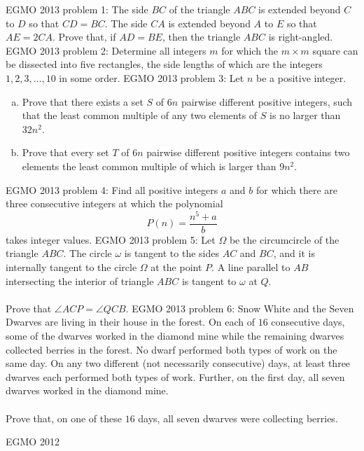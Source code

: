 EGMO 2013 problem 1:  The side $BC$ of the triangle $ABC$ is extended beyond $C$ to $D$ so that $CD = BC$.  The side $CA$ is extended beyond $A$ to $E$ so that $AE = 2CA$.  Prove that, if $AD=BE$, then the triangle $ABC$ is right-angled. 
EGMO 2013 problem 2:  Determine all integers $m$ for which the $m \times m$ square can be dissected into five rectangles, the side lengths of which are the integers $1,2,3,\ldots,10$ in some order. 
EGMO 2013 problem 3:  Let $n$ be a positive integer.
\begin{enumerate}[(a)]
  \item Prove that there exists a set $S$ of $6n$ pairwise different positive integers, such that the least common multiple of any two elements of $S$ is no larger than $32n^2$.
  \item Prove that every set $T$ of $6n$ pairwise different positive integers contains two elements the least common multiple of which is larger than $9n^2$.
\end{enumerate} 
EGMO 2013 problem 4:  Find all positive integers $a$ and $b$ for which there are three consecutive integers at which the polynomial
\[ P(n) = \frac{n^5+a}{b} \]
takes integer values. 
EGMO 2013 problem 5:  Let $\Omega$ be the circumcircle of the triangle $ABC$. The circle $\omega$ is tangent to the sides $AC$ and $BC$, and it is internally tangent to the circle $\Omega$ at the point $P$.  A line parallel to $AB$ intersecting the interior of triangle $ABC$ is tangent to $\omega$ at $Q$. \\\\
Prove that $\angle ACP = \angle QCB$. 
EGMO 2013 problem 6:  Snow White and the Seven Dwarves are living in their house in the forest.  On each of $16$ consecutive days, some of the dwarves worked in the diamond mine while the remaining dwarves collected berries in the forest.  No dwarf performed both types of work on the same day.  On any two different (not necessarily consecutive) days, at least three dwarves each performed both types of work.  Further, on the first day, all seven dwarves worked in the diamond mine. \\\\
Prove that, on one of these $16$ days, all seven dwarves were collecting berries. 

EGMO 2012 

